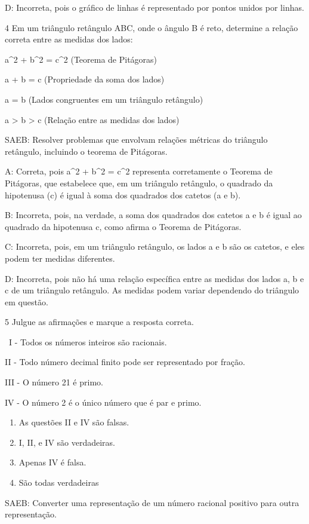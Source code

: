 {D: Incorreta, pois o gráfico de linhas é representado por pontos unidos
por linhas.

\num{4} Em um triângulo retângulo ABC, onde o ângulo B é reto, determine a
relação correta entre as medidas dos lados:
\item a^2 + b^2 = c^2 (Teorema de Pitágoras)
\item a + b = c (Propriedade da soma dos lados)
\item a = b (Lados congruentes em um triângulo retângulo)
\item a \textgreater{} b \textgreater{} c (Relação entre as medidas dos
lados)

SAEB: Resolver problemas que envolvam relações métricas do triângulo
retângulo, incluindo o teorema de Pitágoras.

A: Correta, pois a^2 + b^2 = c^2 representa corretamente o Teorema de
Pitágoras, que estabelece que, em um triângulo retângulo, o quadrado da
hipotenusa (c) é igual à soma dos quadrados dos catetos (a e b).

B: Incorreta, pois, na verdade, a soma dos quadrados dos catetos a e b é
igual ao quadrado da hipotenusa c, como afirma o Teorema de Pitágoras.

C: Incorreta, pois, em um triângulo retângulo, os lados a e b são os
catetos, e eles podem ter medidas diferentes.

D: Incorreta, pois não há uma relação específica entre as medidas dos
lados a, b e c de um triângulo retângulo. As medidas podem variar
dependendo do triângulo em questão.

\num{5} Julgue as afirmações e marque a resposta correta.

~I - Todos os números inteiros são racionais.

II - Todo número decimal finito pode ser representado por fração.

III - O número 21 é primo.

IV - O número 2 é o único número que é par e primo.

\begin{enumerate}
\def\labelenumi{\alph{enumi})}
\item
  As questões II e IV são falsas.
\item
  I, II, e IV são verdadeiras.
\item
  Apenas IV é falsa.
\item
  São todas verdadeiras
\end{enumerate}

SAEB: Converter uma representação de um número racional positivo para
outra representação.

}
